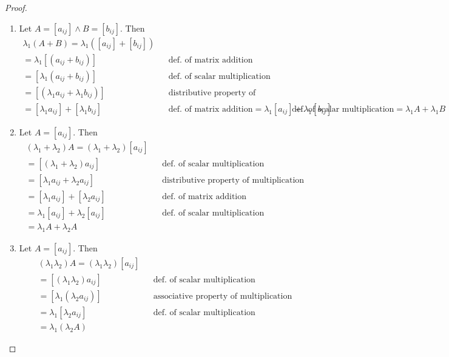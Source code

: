 \documentclass[11pt]{article}
\theoremstyle{definition}
\begin{document}
	\begin{shaded}
		\begin{proof}
			\begin{enumerate}[label=(\alph*)]
				\item Let $A = [a_{ij}] \land B = [b_{ij}]$. Then
				\begin{align*}
					\lambda_1(A+B) = \lambda_1([a_{ij}] + [b_{ij}]) \\
					= \lambda_1[(a_{ij} + b_{ij})] && \text{def. of matrix addition} \\
					= [\lambda_1(a_{ij} + b_{ij})] && \text{def. of scalar multiplication} \\
					= [(\lambda_1a_{ij} + \lambda_1b_{ij})] && \text{distributive property of scalars} \\
					= [\lambda_1a_{ij}] + [\lambda_1b_{ij}] && \text{def. of matrix addition}
					= \lambda_1[a_{ij}] + \lambda_1[b_{ij}] && \text{def. of scalar multiplication}
					= \lambda_1A + \lambda_1B
				\end{align*}
				
				\item Let $A = [a_{ij}]$. Then
				\begin{align*}
					(\lambda_1+\lambda_2)A = (\lambda_1+\lambda_2)[a_{ij}]\\
					= [(\lambda_1+\lambda_2)a_{ij}] && \text{def. of scalar multiplication} \\
					= [\lambda_1a_{ij} + \lambda_2a_{ij}] && \text{distributive property of multiplication} \\
					= [\lambda_1a_{ij}] + [\lambda_2a_{ij}] && \text{def. of matrix addition} \\
					= \lambda_1[a_{ij}] + \lambda_2[a_{ij}] && \text{def. of scalar multiplication} \\
					= \lambda_1A + \lambda_2A
				\end{align*} 
				
				\item Let $A = [a_{ij}]$. Then 
				\begin{align*}
					(\lambda_1\lambda_2)A = (\lambda_1\lambda_2)[a_{ij}] \\
					= [(\lambda_1\lambda_2)a_{ij}] && \text{def. of scalar multiplication} \\
					= [\lambda_1(\lambda_2a_{ij})] && \text{associative property of multiplication} \\
					= \lambda_1[\lambda_2a_{ij}] && \text{def. of scalar multiplication} \\
					= \lambda_1(\lambda_2A)
				\end{align*}
			\end{enumerate}
		\end{proof}
	\end{shaded}
\end{document}
